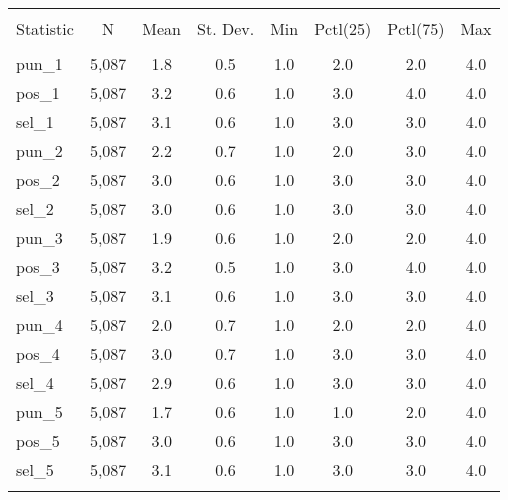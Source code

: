 
\begin{table}[!htbp] \centering 
  \caption{} 
  \label{} 
\begin{tabular}{@{\extracolsep{5pt}}lccccccc} 
\\[-1.8ex]\hline 
\hline \\[-1.8ex] 
Statistic & \multicolumn{1}{c}{N} & \multicolumn{1}{c}{Mean} & \multicolumn{1}{c}{St. Dev.} & \multicolumn{1}{c}{Min} & \multicolumn{1}{c}{Pctl(25)} & \multicolumn{1}{c}{Pctl(75)} & \multicolumn{1}{c}{Max} \\ 
\hline \\[-1.8ex] 
pun\_1 & 5,087 & 1.8 & 0.5 & 1.0 & 2.0 & 2.0 & 4.0 \\ 
pos\_1 & 5,087 & 3.2 & 0.6 & 1.0 & 3.0 & 4.0 & 4.0 \\ 
sel\_1 & 5,087 & 3.1 & 0.6 & 1.0 & 3.0 & 3.0 & 4.0 \\ 
pun\_2 & 5,087 & 2.2 & 0.7 & 1.0 & 2.0 & 3.0 & 4.0 \\ 
pos\_2 & 5,087 & 3.0 & 0.6 & 1.0 & 3.0 & 3.0 & 4.0 \\ 
sel\_2 & 5,087 & 3.0 & 0.6 & 1.0 & 3.0 & 3.0 & 4.0 \\ 
pun\_3 & 5,087 & 1.9 & 0.6 & 1.0 & 2.0 & 2.0 & 4.0 \\ 
pos\_3 & 5,087 & 3.2 & 0.5 & 1.0 & 3.0 & 4.0 & 4.0 \\ 
sel\_3 & 5,087 & 3.1 & 0.6 & 1.0 & 3.0 & 3.0 & 4.0 \\ 
pun\_4 & 5,087 & 2.0 & 0.7 & 1.0 & 2.0 & 2.0 & 4.0 \\ 
pos\_4 & 5,087 & 3.0 & 0.7 & 1.0 & 3.0 & 3.0 & 4.0 \\ 
sel\_4 & 5,087 & 2.9 & 0.6 & 1.0 & 3.0 & 3.0 & 4.0 \\ 
pun\_5 & 5,087 & 1.7 & 0.6 & 1.0 & 1.0 & 2.0 & 4.0 \\ 
pos\_5 & 5,087 & 3.0 & 0.6 & 1.0 & 3.0 & 3.0 & 4.0 \\ 
sel\_5 & 5,087 & 3.1 & 0.6 & 1.0 & 3.0 & 3.0 & 4.0 \\ 
\hline \\[-1.8ex] 
\end{tabular} 
\end{table} 
